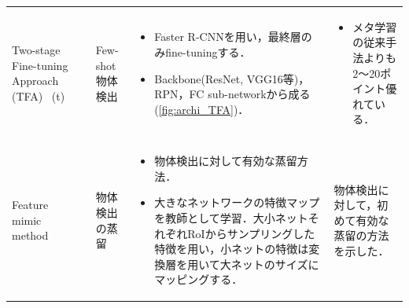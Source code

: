 \documentclass[originalpaper,fleqn]{jsaiart}     %
\begin{document}
\begin{table}
\begin{center}
\begin{tabularx}{\linewidth}{Xp{1.5cm}Xp{7cm}X}
            Two-stage Fine-tuning Approach (TFA) \ (t) 
            \vspace{0.7\baselineskip}
            & \cite{WHGDY20} & Few-shot 物体検出 & 
            \begin{itemize}
                \vspace{-0.7\baselineskip}
                \setlength{\leftskip}{-3mm}
                \item Faster R-CNNを用い，最終層のみfine-tuningする．
                \item Backbone(ResNet, VGG16等)，RPN，FC sub-networkから成る(\ref{fig:archi_TFA})．
            \end{itemize}
            &
            \begin{itemize}
                \vspace{-0.7\baselineskip}
                \setlength{\leftskip}{-3mm}
                \item メタ学習の従来手法よりも2〜20ポイント優れている．
            \end{itemize}
            \\

            Feature mimic method & \cite{LJY17} & 物体検出の蒸留 & 
            \begin{itemize}
                \vspace{-0.7\baselineskip}
                \setlength{\leftskip}{-3mm}
                \item 物体検出に対して有効な蒸留方法．
                \item 大きなネットワークの特徴マップを教師として学習．大小ネットそれぞれRoIからサンプリングした特徴を用い，小ネットの特徴は変換層を用いて大ネットのサイズにマッピングする．
            \end{itemize}
            & 物体検出に対して，初めて有効な蒸留の方法を示した．\\


\end{tabularx}
\end{center}
\end{table}
\end{document}

